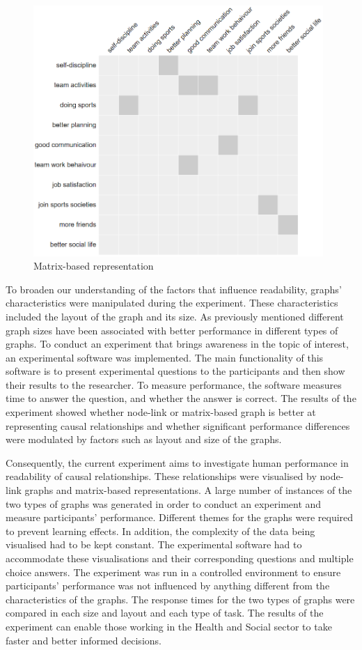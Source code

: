 \documentclass{l4proj}
\begin{document}
\begin{figure}[H]
\centering
\includegraphics[width=11cm]{images/gymSmallAlpha.PNG}
\caption{Matrix-based representation}
\label{gymSmallAlphaintro}
\end{figure}
 
To broaden our understanding of the factors that influence readability, graphs' characteristics were manipulated during the experiment. These characteristics included the layout of the graph and its size. As previously mentioned different graph sizes have been associated with better performance in different types of graphs. To conduct an experiment that brings awareness in the topic of interest, an experimental software was implemented. The main functionality of this software is to present experimental questions to the participants and then show their results to the researcher. To measure performance, the software measures time to answer the question, and whether the answer is correct. The results of the experiment showed whether node-link or matrix-based graph is better at representing causal relationships and whether significant performance differences were modulated by factors such as layout and size of the graphs. 

Consequently, the current experiment aims to investigate human performance in readability of causal relationships. These relationships were visualised by node-link graphs and matrix-based representations. A large number of instances of the two types of graphs was generated in order to conduct an experiment and measure participants' performance. Different themes for the graphs were required to prevent learning effects. In addition, the complexity of the data being visualised had to be kept constant. The experimental software had to accommodate these visualisations and their corresponding questions and multiple choice answers. The experiment was run in a controlled environment to ensure participants' performance was not influenced by anything different from the characteristics of the graphs. The response times for the two types of graphs were compared in each size and layout and each type of task. The results of the experiment can enable those working in the Health and Social sector to take faster and better informed decisions. 
\end{document}
